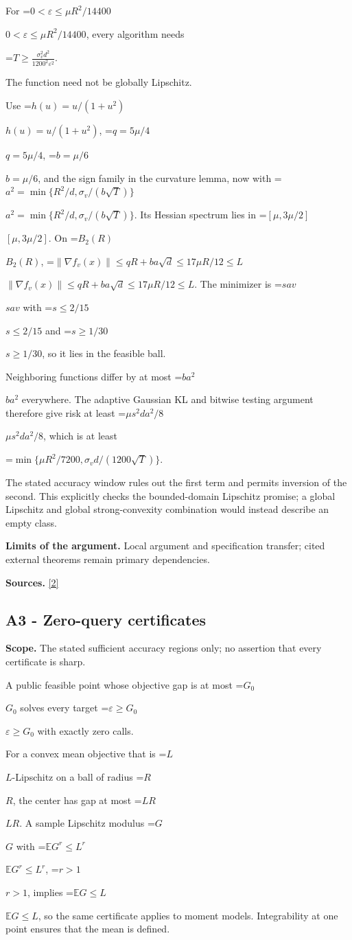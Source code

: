 \documentclass[10pt,a4paper]{article}
\newcommand{\AtlasMath}[1]{\par\begingroup\centering\setbox0=\hbox{$\displaystyle #1$}\ifdim\wd0>1.4\linewidth\typeout{ATLAS WIDE FORMULA: \the\wd0}\fi\ifdim\wd0>\linewidth\resizebox{\linewidth}{!}{\box0}\else\box0\fi\par\endgroup}
\newcommand{\AtlasInlineMath}[1]{\begingroup\setbox0=\hbox{$#1$}\ifdim\wd0>.4\linewidth\endgroup\AtlasMath{#1}\else\endgroup$#1$\fi}
\begin{document}
For \AtlasInlineMath{0<\varepsilon\le\mu R^2/14400}, every algorithm needs

\AtlasMath{T\ge\frac{\sigma_v^2d^2}{1200^2\varepsilon^2}.}

The function need not be globally Lipschitz.

Use \AtlasInlineMath{h(u)=u/(1+u^2)}, \AtlasInlineMath{q=5\mu/4}, \AtlasInlineMath{b=\mu/6}, and the sign family in the curvature lemma, now with \AtlasInlineMath{a^2=\min\{R^2/d,\sigma_v/(b\sqrt T)\}}. Its Hessian spectrum lies in \AtlasInlineMath{[\mu,3\mu/2]}. On \AtlasInlineMath{B_2(R)}, \AtlasInlineMath{\|\nabla f_v(x)\|\le qR+ba\sqrt d\le17\mu R/12\le L}. The minimizer is \AtlasInlineMath{sav} with \AtlasInlineMath{s\le2/15} and \AtlasInlineMath{s\ge1/30}, so it lies in the feasible ball.

Neighboring functions differ by at most \AtlasInlineMath{ba^2} everywhere. The adaptive Gaussian KL and bitwise testing argument therefore give risk at least \AtlasInlineMath{\mu s^2da^2/8}, which is at least

\AtlasMath{\min\{\mu R^2/7200,\sigma_vd/(1200\sqrt T)\}.}

The stated accuracy window rules out the first term and permits inversion of the second. This explicitly checks the bounded-domain Lipschitz promise; a global Lipschitz and global strong-convexity combination would instead describe an empty class.

\textbf{Limits of the argument.} Local argument and specification transfer; cited external theorems remain primary dependencies.

\textbf{Sources.} \href{https://proceedings.mlr.press/v30/Shamir13.html}{[2]}

\subsection{A3 - Zero-query certificates}
\textbf{Scope.} The stated sufficient accuracy regions only; no assertion that every certificate is sharp.

A public feasible point whose objective gap is at most \AtlasInlineMath{G_0} solves every target \AtlasInlineMath{\varepsilon\ge G_0} with exactly zero calls.

For a convex mean objective that is \AtlasInlineMath{L}-Lipschitz on a ball of radius \AtlasInlineMath{R}, the center has gap at most \AtlasInlineMath{LR}. A sample Lipschitz modulus \AtlasInlineMath{G} with \AtlasInlineMath{\mathbb E G^r\le L^r}, \AtlasInlineMath{r>1}, implies \AtlasInlineMath{\mathbb E G\le L}, so the same certificate applies to moment models. Integrability at one point ensures that the mean is defined.
\end{document}
